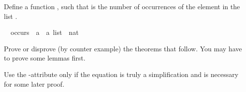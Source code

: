 %
\begin{isabellebody}%
\def\isabellecontext{a{\isadigit{1}}}%
\isamarkupfalse%
%
\isamarkuptrue%
%
\begin{isamarkuptext}%
Define a function , such that  
is the number of occurrences of the element  in the list
.%
\end{isamarkuptext}%
\isamarkuptrue%
\ \ occurs\ {\isacharcolon}{\isacharcolon}\ {\isachardoublequote}{\isacharprime}a\ {\isasymRightarrow}\ {\isacharprime}a\ list\ {\isasymRightarrow}\ nat{\isachardoublequote}\isamarkupfalse%
%
\begin{isamarkuptext}%
Prove or disprove (by counter example) the theorems that follow. You may have to prove some lemmas first.

Use the -attribute only if the equation is truly a
simplification and is necessary for some later proof.


\end{isamarkuptext}
\end{isabellebody}
